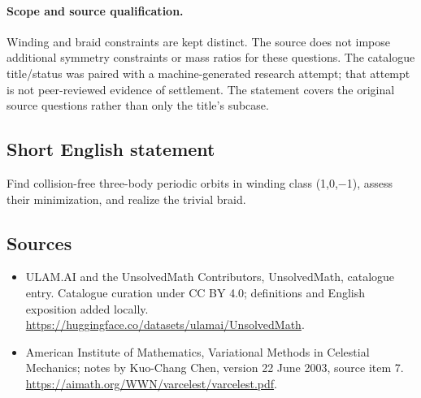 \documentclass[11pt]{article}
\begin{document}
\paragraph{Scope and source qualification.}Winding and braid constraints are kept distinct. The source does not impose additional symmetry constraints or mass ratios for these questions. The catalogue title/status was paired with a machine-generated research attempt; that attempt is not peer-reviewed evidence of settlement. The statement covers the original source questions rather than only the title’s subcase.
\subsection{Short English statement}
Find collision-free three-body periodic orbits in winding class (1,0,−1), assess their minimization, and realize the trivial braid.
\subsection{Sources}
\begin{itemize}
\item[\hypertarget{source:statement:1}{S1}] ULAM.AI and the UnsolvedMath Contributors, UnsolvedMath, catalogue entry. Catalogue curation under CC BY 4.0; definitions and English exposition added locally.
\url{https://huggingface.co/datasets/ulamai/UnsolvedMath}.
\item[\hypertarget{source:statement:2}{S2}] American Institute of Mathematics, Variational Methods in Celestial Mechanics; notes by Kuo-Chang Chen, version 22 June 2003, source item 7.
\url{https://aimath.org/WWN/varcelest/varcelest.pdf}.
\end{itemize}
\label{end:statement}
\end{document}
